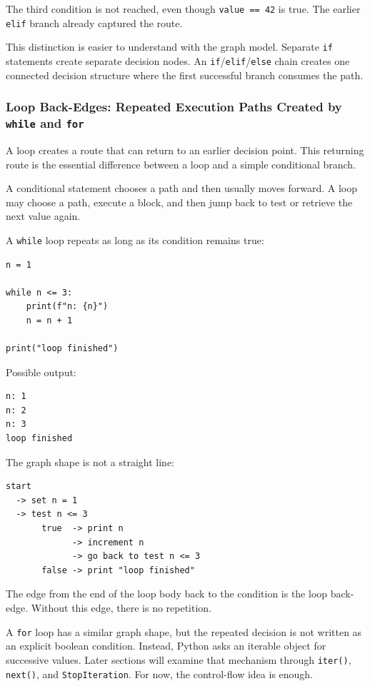 The third condition is not reached, even though \texttt{value == 42} is true. The earlier \texttt{elif} branch already captured the route.

This distinction is easier to understand with the graph model. Separate \texttt{if} statements create separate decision nodes. An \texttt{if}/\texttt{elif}/\texttt{else} chain creates one connected decision structure where the first successful branch consumes the path.

\subsubsection{Loop Back-Edges: Repeated Execution Paths Created by \texttt{while} and \texttt{for}}

A loop creates a route that can return to an earlier decision point. This returning route is the essential difference between a loop and a simple conditional branch.

A conditional statement chooses a path and then usually moves forward. A loop may choose a path, execute a block, and then jump back to test or retrieve the next value again.

A \texttt{while} loop repeats as long as its condition remains true:

\begin{verbatim}
n = 1

while n <= 3:
    print(f"n: {n}")
    n = n + 1

print("loop finished")
\end{verbatim}

Possible output:

\begin{verbatim}
n: 1
n: 2
n: 3
loop finished
\end{verbatim}

The graph shape is not a straight line:

\begin{verbatim}
start
  -> set n = 1
  -> test n <= 3
       true  -> print n
             -> increment n
             -> go back to test n <= 3
       false -> print "loop finished"
\end{verbatim}

The edge from the end of the loop body back to the condition is the loop back-edge. Without this edge, there is no repetition.

A \texttt{for} loop has a similar graph shape, but the repeated decision is not written as an explicit boolean condition. Instead, Python asks an iterable object for successive values. Later sections will examine that mechanism through \texttt{iter()}, \texttt{next()}, and \texttt{StopIteration}. For now, the control-flow idea is enough.

